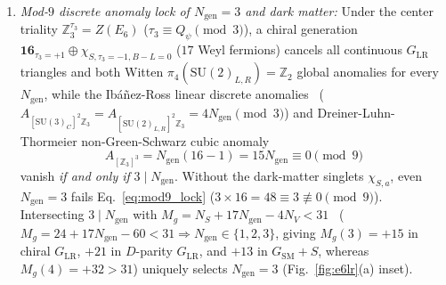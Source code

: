 \documentclass[aps,prd,twocolumn,nofootinbib,floatfix]{revtex4-2}
\begin{document}
\begin{enumerate}
    \item \emph{Mod-$9$ discrete anomaly lock of $N_{\mathrm{gen}} = 3$ and dark matter:} Under the center triality $\mathbb{Z}_3^{\tau_3} = Z(E_6)$ ($\tau_3 \equiv Q_\psi \pmod 3$), a chiral generation $\mathbf{16}_{\tau_3=+1} \oplus \chi_{S,\tau_3=-1,B-L=0}$ ($17$ Weyl fermions) cancels all continuous $G_{\mathrm{LR}}$ triangles and both Witten $\pi_4(\mathrm{SU}(2)_{L,R}) = \mathbb{Z}_2$ global anomalies for every $N_{\mathrm{gen}}$, while the Ib\'a\~nez-Ross linear discrete anomalies~\cite{IbanezRoss1991} ($A_{[\mathrm{SU}(3)_C]^2\mathbb{Z}_3} = A_{[\mathrm{SU}(2)_{L,R}]^2\mathbb{Z}_3} = 4 N_{\mathrm{gen}} \pmod 3$) and Dreiner-Luhn-Thormeier non-Green-Schwarz cubic anomaly~\cite{DreinerLuhnThormeier2006}
    \begin{equation}
    \label{eq:mod9_lock}
    A_{[\mathbb{Z}_3]^3} = N_{\mathrm{gen}}(16 - 1) = 15 N_{\mathrm{gen}} \equiv 0 \pmod 9
    \end{equation}
    vanish \emph{if and only if} $3 \mid N_{\mathrm{gen}}$. Without the dark-matter singlets $\chi_{S,a}$, even $N_{\mathrm{gen}} = 3$ fails Eq.~\eqref{eq:mod9_lock} ($3\times 16 = 48 \equiv 3 \not\equiv 0 \pmod 9$). Intersecting $3 \mid N_{\mathrm{gen}}$ with $M_g = N_S + 17 N_{\mathrm{gen}} - 4 N_V < 31$~\cite{DonaEichhornPercacci2014} ($M_g = 24 + 17 N_{\mathrm{gen}} - 60 < 31 \Rightarrow N_{\mathrm{gen}} \in \{1,2,3\}$, giving $M_g(3) = +15$ in chiral $G_{\mathrm{LR}}$, $+21$ in $D$-parity $G_{\mathrm{LR}}$, and $+13$ in $G_{\mathrm{SM}}+S$, whereas $M_g(4) = +32 > 31$) uniquely selects $N_{\mathrm{gen}} = 3$ (Fig.~\ref{fig:e6lr}(a) inset).

\end{enumerate}
\end{document}
